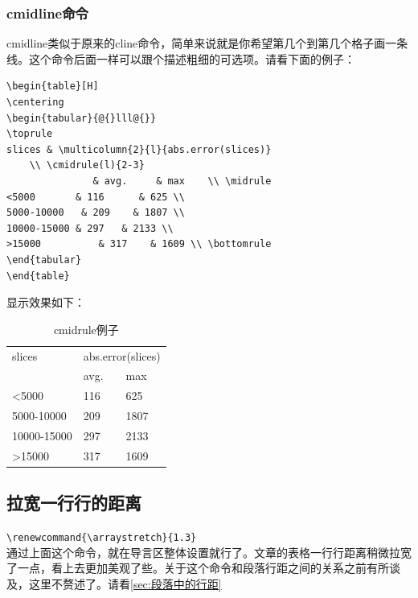 \documentclass[12pt,oneside]{book}
\begin{document}
\begin{common-format}
\subsubsection{cmidline命令}
cmidline类似于原来的cline命令，简单来说就是你希望第几个到第几个格子画一条线。这个命令后面一样可以跟个描述粗细的可选项。请看下面的例子：

\begin{Verbatim}
\begin{table}[H]
\centering
\begin{tabular}{@{}lll@{}}
\toprule
slices & \multicolumn{2}{l}{abs.error(slices)} 
    \\ \cmidrule(l){2-3} 
               & avg.     & max    \\ \midrule
<5000       & 116      & 625 \\
5000-10000   & 209    & 1807 \\
10000-15000 & 297   & 2133 \\
>15000          & 317    & 1609 \\ \bottomrule
\end{tabular}
\end{table}
\end{Verbatim}

显示效果如下：
\begin{table}[H]
\centering
\begin{tabular}{@{}lll@{}}
\toprule
slices      & \multicolumn{2}{l}{abs.error(slices)} \\ \cmidrule(l){2-3} 
            & avg.              & max               \\ \midrule
<5000       & 116               & 625               \\
5000-10000  & 209               & 1807              \\
10000-15000 & 297               & 2133              \\
>15000      & 317               & 1609              \\ \bottomrule
\end{tabular}
\caption{cmidrule例子}
\label{tab:cmidrule例子}
\end{table}



\subsection{拉宽一行行的距离}
\verb+\renewcommand{\arraystretch}{1.3}+\\
通过上面这个命令，就在导言区整体设置就行了。文章的表格一行行距离稍微拉宽了一点，看上去更加美观了些。关于这个命令和段落行距之间的关系之前有所谈及，这里不赘述了。请看\ref{sec:段落中的行距}


\end{common-format}
\end{document}
